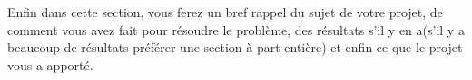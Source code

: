 Enfin dans cette section, vous ferez un bref rappel du sujet de votre projet, de comment vous avez fait pour résoudre le problème, des résultats s'il y en a(s'il y a beaucoup de résultats préférer une section à part entière) et enfin ce que le projet vous a apporté.